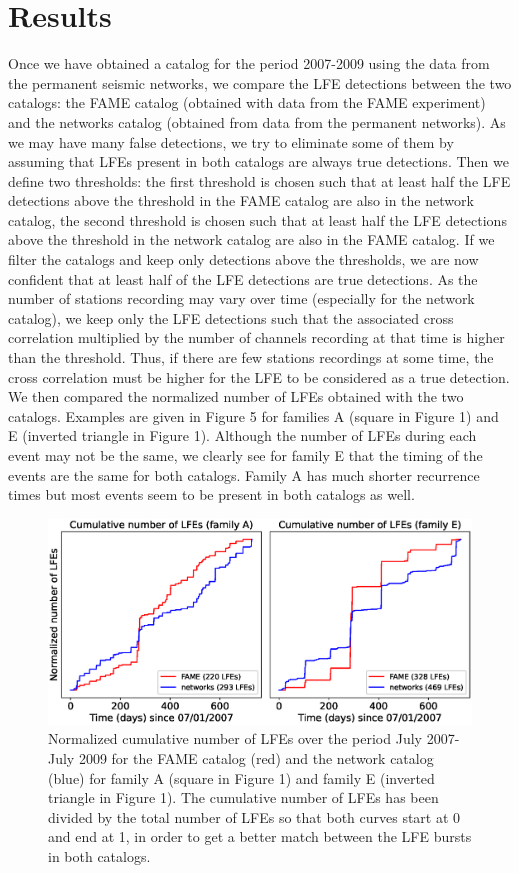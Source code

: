 \documentclass[draft]{agujournal2019}
\begin{document}
\section{Results}

Once we have obtained a catalog for the period 2007-2009 using the data from the permanent seismic networks, we compare the LFE detections between the two catalogs: the FAME catalog (obtained with data from the FAME experiment) and the networks catalog (obtained from data from the permanent networks). As we may have many false detections, we try to eliminate some of them by assuming that LFEs present in both catalogs are always true detections. Then we define two thresholds: the first threshold is chosen such that at least half the LFE detections above the threshold in the FAME catalog are also in the network catalog, the second threshold is chosen such that at least half the LFE detections above the threshold in the network catalog are also in the FAME catalog. If we filter the catalogs and keep only detections above the thresholds, we are now confident that at least half of the LFE detections are true detections. As the number of stations recording may vary over time (especially for the network catalog), we keep only the LFE detections such that the associated cross correlation multiplied by the number of channels recording at that time is higher than the threshold. Thus, if there are few stations recordings at some time, the cross correlation must be higher for the LFE to be considered as a true detection. We then compared the normalized number of LFEs obtained with the two catalogs. Examples are given in Figure 5 for families A (square in Figure 1) and E (inverted triangle in Figure 1). Although the number of LFEs during each event may not be the same, we clearly see for family E that the timing of the events are the same for both catalogs. Family A has much shorter recurrence times but most events seem to be present in both catalogs as well. \\

\begin{figure}
\noindent\includegraphics[width=\textwidth, trim={0cm 0cm 0cm 0cm},clip]{figures/cumulative.eps}
\caption{Normalized cumulative number of LFEs over the period July 2007-July 2009 for the FAME catalog (red) and the network catalog (blue) for family A (square in Figure 1) and family E (inverted triangle in Figure 1). The cumulative number of LFEs has been divided by the total number of LFEs so that both curves start at 0 and end at 1, in order to get a better match between the LFE bursts in both catalogs.}
\label{pngfiguresample}
\end{figure}
\end{document}
